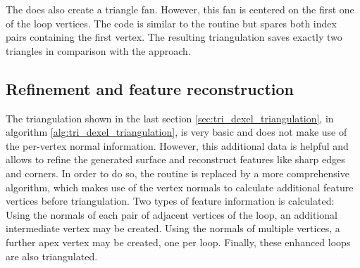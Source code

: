The  does also create a triangle fan.
However, this fan is centered on the first one of the loop vertices.
The code is similar to the  routine but spares both index pairs containing the first vertex.
The resulting triangulation saves exactly two triangles in comparison with the  approach.


\subsection{Refinement and feature reconstruction}
\label{sec:tri_dexel_refinement}

The triangulation shown in the last section \ref{sec:tri_dexel_triangulation},  in algorithm \ref{alg:tri_dexel_triangulation}, is very basic and does not make use of the per-vertex normal information.
However, this additional data is helpful and allows to refine the generated surface and reconstruct features like sharp edges and corners.
In order to do so, the  routine is replaced by a more comprehensive algorithm, which makes use of the vertex normals to calculate additional feature vertices before triangulation.
Two types of feature information is calculated:
Using the normals of each pair of adjacent vertices of the loop, an additional intermediate vertex may be created.
Using the normals of multiple vertices, a further apex vertex may be created, one per loop.
Finally, these enhanced loops are also triangulated.

